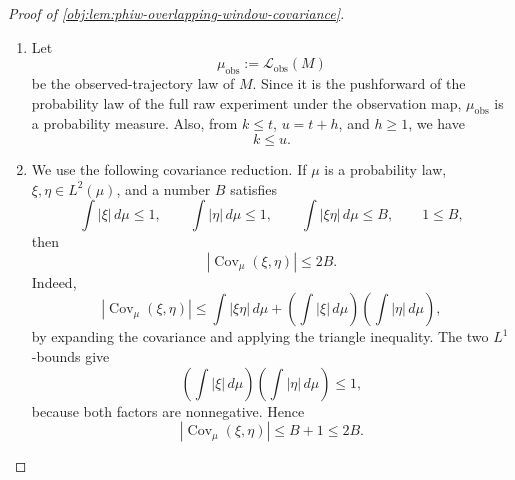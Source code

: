 \documentclass[11pt]{article}
\begin{document}
\begin{proof}[Proof of \cref{obj:lem:phiw-overlapping-window-covariance}]
\begin{enumerate}
\item Let
\[
\mu_{\mathrm{obs}}:=\mathcal L_{\mathrm{obs}}(M)
\]
be the observed-trajectory law of \(M\). Since it is the pushforward of the probability law of the full raw experiment under the observation map, \(\mu_{\mathrm{obs}}\) is a probability measure. Also, from \(k\le t\), \(u=t+h\), and \(h\ge 1\), we have
\[
k\le u .
\]

\item We use the following covariance reduction. If \(\mu\) is a probability law, \(\xi,\eta\in L^2(\mu)\), and a number \(B\) satisfies
\[
\int |\xi|\,d\mu\le 1,\qquad
\int |\eta|\,d\mu\le 1,\qquad
\int |\xi\eta|\,d\mu\le B,\qquad
1\le B,
\]
then
\[
|\operatorname{Cov}_{\mu}(\xi,\eta)|\le 2B .
\]
Indeed,
\[
|\operatorname{Cov}_{\mu}(\xi,\eta)|
\le
\int |\xi\eta|\,d\mu
+
\left(\int |\xi|\,d\mu\right)
\left(\int |\eta|\,d\mu\right),
\]
by expanding the covariance and applying the triangle inequality. The two \(L^1\)-bounds give
\[
\left(\int |\xi|\,d\mu\right)
\left(\int |\eta|\,d\mu\right)\le 1,
\]
because both factors are nonnegative. Hence
\[
|\operatorname{Cov}_{\mu}(\xi,\eta)|
\le B+1\le 2B .
\]


\end{enumerate}
\end{proof}
\end{document}
